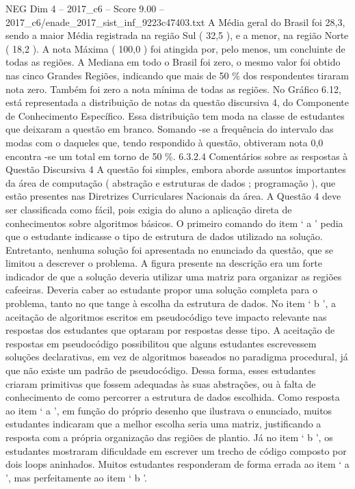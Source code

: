 \begin{textsample}{NEG Dim 4 – 2017\_c6 – Score 9.00 – 2017\_c6/enade\_2017\_sist\_inf\_9223c47403.txt}
A Média geral do Brasil foi 28,3, sendo a maior Média registrada na região Sul ( 32,5 ), e a menor, na região Norte ( 18,2 ).
A nota Máxima ( 100,0 ) foi atingida por, pelo menos, um concluinte de todas as regiões.
A Mediana em todo o Brasil foi zero, o mesmo valor foi obtido nas cinco Grandes Regiões, indicando que mais de 50 \% dos respondentes tiraram nota zero.
Também foi zero a nota mínima de todas as regiões.
No Gráfico 6.12, está representada a distribuição de notas da questão discursiva 4, do Componente de Conhecimento Específico.
Essa distribuição tem moda na classe de estudantes que deixaram a questão em branco.
Somando -se a frequência do intervalo das modas com o daqueles que, tendo respondido à questão, obtiveram nota 0,0 encontra -se um total em torno de 50 \%. 6.3.2.4 Comentários sobre as respostas à Questão Discursiva 4 A questão foi simples, embora aborde assuntos importantes da área de computação ( abstração e estruturas de dados ; programação ), que estão presentes nas Diretrizes Curriculares Nacionais da área.
A Questão 4 deve ser classificada como fácil, pois exigia do aluno a aplicação direta de conhecimentos sobre algoritmos básicos.
O primeiro comando do item ‘ a ’ pedia que o estudante indicasse o tipo de estrutura de dados utilizado na solução.
Entretanto, nenhuma solução foi apresentada no enunciado da questão, que se limitou a descrever o problema.
A figura presente na descrição era um forte indicador de que a solução deveria utilizar uma matriz para organizar as regiões cafeeiras.
Deveria caber ao estudante propor uma solução completa para o problema, tanto no que tange à escolha da estrutura de dados.
No item ‘ b ’, a aceitação de algoritmos escritos em pseudocódigo teve impacto relevante nas respostas dos estudantes que optaram por respostas desse tipo.
A aceitação de respostas em pseudocódigo possibilitou que alguns estudantes escrevessem soluções declarativas, em vez de algoritmos baseados no paradigma procedural, já que não existe um padrão de pseudocódigo.
Dessa forma, esses estudantes criaram primitivas que fossem adequadas às suas abstrações, ou à falta de conhecimento de como percorrer a estrutura de dados escolhida.
Como resposta ao item ‘ a ’, em função do próprio desenho que ilustrava o enunciado, muitos estudantes indicaram que a melhor escolha seria uma matriz, justificando a resposta com a própria organização das regiões de plantio.
Já no item ‘ b ’, os estudantes mostraram dificuldade em escrever um trecho de código composto por dois loops aninhados.
Muitos estudantes responderam de forma errada ao item ‘ a ’, mas perfeitamente ao item ‘ b ’.

\end{textsample}
